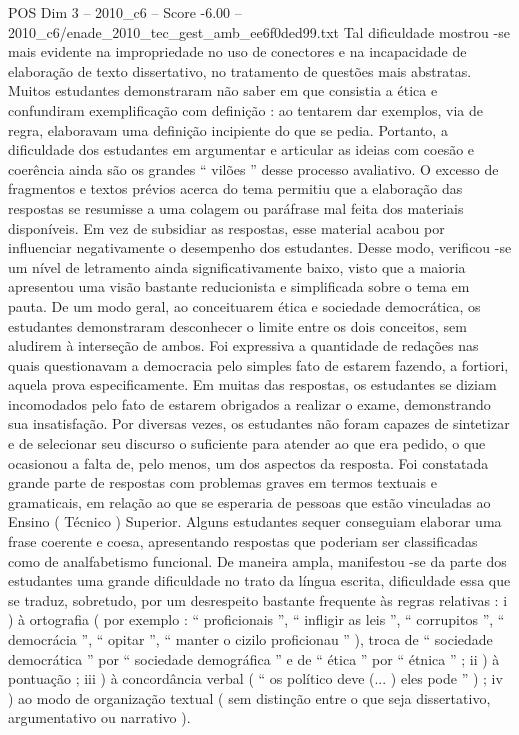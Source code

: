 \begin{textsample}{POS Dim 3 – 2010\_c6 – Score -6.00 – 2010\_c6/enade\_2010\_tec\_gest\_amb\_ee6f0ded99.txt}
Tal dificuldade mostrou -se mais evidente na impropriedade no uso de conectores e na incapacidade de elaboração de texto dissertativo, no tratamento de questões mais abstratas.
Muitos estudantes demonstraram não saber em que consistia a ética e confundiram exemplificação com definição : ao tentarem dar exemplos, via de regra, elaboravam uma definição incipiente do que se pedia.
Portanto, a dificuldade dos estudantes em argumentar e articular as ideias com coesão e coerência ainda são os grandes “ vilões ” desse processo avaliativo.
O excesso de fragmentos e textos prévios acerca do tema permitiu que a elaboração das respostas se resumisse a uma colagem ou paráfrase mal feita dos materiais disponíveis.
Em vez de subsidiar as respostas, esse material acabou por influenciar negativamente o desempenho dos estudantes.
Desse modo, verificou -se um nível de letramento ainda significativamente baixo, visto que a maioria apresentou uma visão bastante reducionista e simplificada sobre o tema em pauta.
De um modo geral, ao conceituarem ética e sociedade democrática, os estudantes demonstraram desconhecer o limite entre os dois conceitos, sem aludirem à interseção de ambos.
Foi expressiva a quantidade de redações nas quais questionavam a democracia pelo simples fato de estarem fazendo, a fortiori, aquela prova especificamente.
Em muitas das respostas, os estudantes se diziam incomodados pelo fato de estarem obrigados a realizar o exame, demonstrando sua insatisfação.
Por diversas vezes, os estudantes não foram capazes de sintetizar e de selecionar seu discurso o suficiente para atender ao que era pedido, o que ocasionou a falta de, pelo menos, um dos aspectos da resposta.
Foi constatada grande parte de respostas com problemas graves em termos textuais e gramaticais, em relação ao que se esperaria de pessoas que estão vinculadas ao Ensino ( Técnico ) Superior.
Alguns estudantes sequer conseguiam elaborar uma frase coerente e coesa, apresentando respostas que poderiam ser classificadas como de analfabetismo funcional.
De maneira ampla, manifestou -se da parte dos estudantes uma grande dificuldade no trato da língua escrita, dificuldade essa que se traduz, sobretudo, por um desrespeito bastante frequente às regras relativas : i ) à ortografia ( por exemplo : “ proficionais ”, “ infligir as leis ”, “ corrupitos ”, “ democrácia ”, “ opitar ”, “ manter o cizilo proficionau ” ), troca de “ sociedade democrática ” por “ sociedade demográfica ” e de “ ética ” por “ étnica ” ; ii ) à pontuação ; iii ) à concordância verbal ( “ os político deve (... ) eles pode ” ) ; iv ) ao modo de organização textual ( sem distinção entre o que seja dissertativo, argumentativo ou narrativo ).

\end{textsample}
